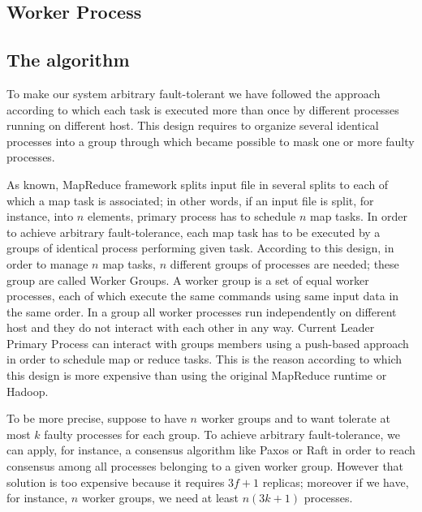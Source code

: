 \documentclass[sigchi]{acmart}
\begin{document}
\subsection{Worker Process}











\subsection{The algorithm}

To make our system arbitrary fault-tolerant we have followed the approach according to which each task is executed more than once by different processes running on different host. This design requires to organize several identical processes into a group through which became possible to mask one or more faulty processes. 

As known, MapReduce framework splits input file in several splits to each of which a map task is associated; in other words, if an input file is split, for instance, into $n$ elements, primary process has to schedule $n$ map tasks. In order to achieve arbitrary fault-tolerance, each map task has to be executed by a groups of identical process performing given task. According to this design, in order to manage $n$ map tasks, $n$ different groups of processes are needed; these group are called Worker Groups. A worker group is a set of equal worker processes, each of which execute the same commands using same input data in the same order. In a group all worker processes run independently on different host and they do not interact with each other in any way. Current Leader Primary Process can interact with groups members using a push-based approach in order to schedule map or reduce tasks. This is the reason according to which this design is more expensive than using the original MapReduce runtime or Hadoop.

To be more precise, suppose to have $n$ worker groups and to want tolerate at most $k$ faulty processes for each group. To achieve arbitrary fault-tolerance, we can apply, for instance, a consensus algorithm like Paxos or Raft in order to reach consensus among all processes belonging to a given worker group. However that solution is too expensive because it requires $3f + 1$ replicas; moreover if we have, for instance, $n$ worker groups, we need at least $n(3k + 1)$ processes.
\end{document}

